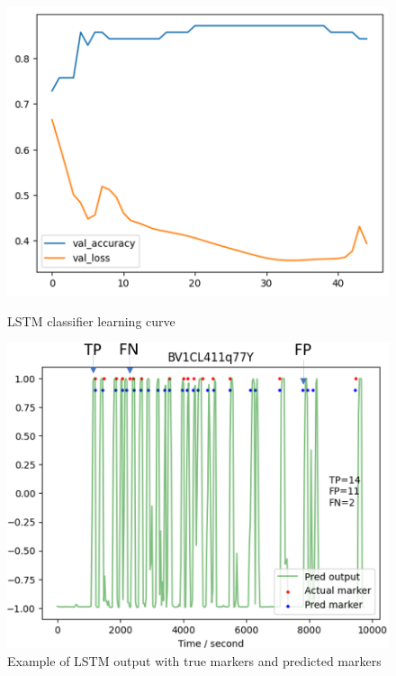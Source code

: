 \documentclass{article}
\begin{document}
    \begin{figure}[H]
        \begin{minipage}{0.49\linewidth}
            \includegraphics[width=\linewidth]{figures/lstm_lc.png}
            \caption{LSTM classifier learning curve}
            \label{lstm_lc}
        \end{minipage}
        \begin{minipage}{0.49\linewidth}
            \includegraphics[width=\linewidth]{figures/TP_FP_ex.png}
            \caption{Example of LSTM output with true markers and predicted markers}
            \label{TP_FP_ex}
        \end{minipage}
    \end{figure}
\end{document}
